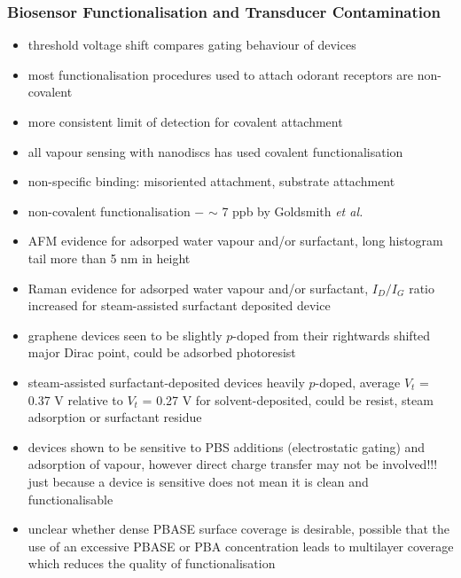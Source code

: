 \documentclass[
  letterpaper,
  DIV=11,
  numbers=noendperiod]{scrartcl}
\begin{document}
\hypertarget{biosensor-functionalisation-and-transducer-contamination}{%
\subsubsection{Biosensor Functionalisation and Transducer
Contamination}\label{biosensor-functionalisation-and-transducer-contamination}}

\begin{itemize}
\item
  threshold voltage shift compares gating behaviour of devices
\item
  most functionalisation procedures used to attach odorant receptors are
  non-covalent
\item
  more consistent limit of detection for covalent attachment
\item
  all vapour sensing with nanodiscs has used covalent functionalisation
\item
  non-specific binding: misoriented attachment, substrate attachment\\
\item
  non-covalent functionalisation \(-\) \(\sim\) 7 ppb by Goldsmith
  \emph{et al.}
\item
  AFM evidence for adsorped water vapour and/or surfactant, long
  histogram tail more than 5 nm in height
\item
  Raman evidence for adsorped water vapour and/or surfactant,
  \(I_{D}/I_{G}\) ratio increased for steam-assisted surfactant
  deposited device
\item
  graphene devices seen to be slightly \(p\)-doped from their rightwards
  shifted major Dirac point, could be adsorbed photoresist
\item
  steam-assisted surfactant-deposited devices heavily \(p\)-doped,
  average \(V_t\) = 0.37 V relative to \(V_t\) = 0.27 V for
  solvent-deposited, could be resist, steam adsorption or surfactant
  residue
\item
  devices shown to be sensitive to PBS additions (electrostatic gating)
  and adsorption of vapour, however direct charge transfer may not be
  involved!!! just because a device is sensitive does not mean it is
  clean and functionalisable
\item
  unclear whether dense PBASE surface coverage is desirable, possible
  that the use of an excessive PBASE or PBA concentration leads to
  multilayer coverage which reduces the quality of functionalisation
\end{itemize}
\end{document}
